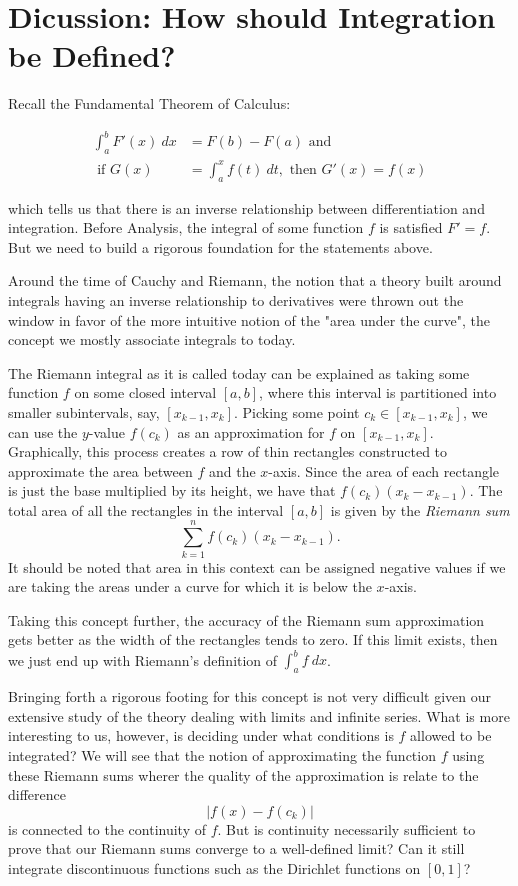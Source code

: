 \section{Dicussion: How should Integration be Defined?}


Recall the Fundamental Theorem of Calculus:

\begin{align*}
	\int_{ a }^{ b } F'(x) \ dx  &= F(b) - F(a) \text{ and } \\
	\text{ if } G(x) &= \int_{ a }^{ x } f(t) \ dt, \text{ then } G'(x) = f(x)
\end{align*}
 
which tells us that there is an inverse relationship between differentiation and integration. Before Analysis, the integral of some function \( f  \) is satisfied \( F' = f  \). But we need to build a rigorous foundation for the statements above. 

Around the time of Cauchy and Riemann, the notion that a theory built around integrals having an inverse relationship to derivatives were thrown out the window in favor of the more intuitive notion of the "area under the curve", the concept we mostly associate integrals to today.

The Riemann integral as it is called today can be explained as taking some function \( f  \) on some closed interval \( [a,b] \), where this interval is partitioned into smaller subintervals, say, \( [ x_{k-1}, x_{k}] \). Picking some point \( c_{k } \in [x_{k-1} , x_{k }] \), we can use the \( y \)-value \( f(c_{k }) \) as an approximation for \( f  \) on \( [x_{k-1}, x_{k }] \). Graphically, this process creates a row of thin rectangles constructed to approximate the area between \( f  \) and the \( x  \)-axis. Since the area of each rectangle is just the base multiplied by its height, we have that \( f(c_{k })(x_{ k } - x_{k - 1 }) \). The total area of all the rectangles in the interval \( [a,b] \) is given by the \textit{Riemann sum} 
\[  \sum_{ k=1 }^{ n } f(c_{k })( x_{k } - x_{k -1}).\] It should be noted that area in this context can be assigned negative values if we are taking the areas under a curve for which it is below the \( x \)-axis.

Taking this concept further, the accuracy of the Riemann sum approximation gets better as the width of the rectangles tends to zero. If this limit exists, then we just end up with Riemann's definition of \( \int_{ a }^{ b } f \ dx \). 

Bringing forth a rigorous footing for this concept is not very difficult given our extensive study of the theory dealing with limits and infinite series. What is more interesting to us, however, is deciding under what conditions is \( f  \) allowed to be integrated? 
We will see that the notion of approximating the function \( f  \) using these Riemann sums wherer the quality of the approximation is relate to the difference
\[  | f(x) - f(c_{k }) | \] is connected to the continuity of \( f  \). But is continuity necessarily sufficient to prove that our Riemann sums converge to a well-defined limit? Can it still integrate discontinuous functions such as the Dirichlet functions on \( [0,1] \)?  



